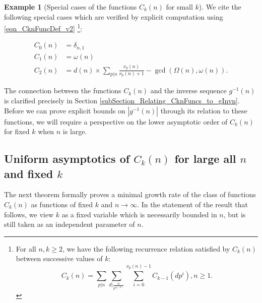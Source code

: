 \documentclass[11pt,reqno,a4letter]{article}
\numberwithin{figure}{section}
\numberwithin{table}{section}
\newcommand{\seqnum}[1]{\href{http://oeis.org/#1}{\color{ProcessBlue}{\underline{#1}}}}
\theoremstyle{plain}
\numberwithin{theorem}{section}
\theoremstyle{definition}
\newtheorem{example}[theorem]{Example}
\newcommand{\NBRef}[1]{}
\begin{document}
\begin{example}[Special cases of the functions $C_k(n)$ for small $k$] 
\label{example_SpCase_Ckn} 
We cite the following special cases which are verified by 
explicit computation using \eqref{eqn_CknFuncDef_v2} 
\cite[\seqnum{A066922}]{OEIS}\footnote{ 
     For all $n,k \geq 2$, we have the following recurrence 
     relation satisfied by $C_k(n)$ between successive values of $k$: 
     \begin{equation*}
     C_k(n) = \sum_{p|n} \sum_{d\rvert\frac{n}{p^{\nu_p(n)}}} \sum_{i=0}^{\nu_p(n)-1} 
          C_{k-1}\left(dp^i\right), n \geq 1. 
     \end{equation*}
}: 
\NBRef{A07-2020-04-26} 
\begin{align*} 
C_0(n) & = \delta_{n,1} \\ 
C_1(n) & = \omega(n) \\ 
C_2(n) & = d(n) \times \sum_{p|n} \frac{\nu_p(n)}{\nu_p(n)+1} - \gcd\left(\Omega(n), \omega(n)\right). 
\end{align*} 
\end{example} 

The connection between the functions $C_k(n)$ and the inverse sequence $g^{-1}(n)$ is 
clarified precisely in Section \ref{subSection_Relating_CknFuncs_to_gInvn}. Before we can prove explicit 
bounds on $|g^{-1}(n)|$ through its relation to these functions, we will require a perspective 
on the lower asymptotic order of $C_k(n)$ for fixed $k$ when $n$ is large. 

\subsection{Uniform asymptotics of $C_k(n)$ for large all $n$ and fixed $k$} 

The next theorem formally proves a minimal growth rate of the class of functions 
$C_k(n)$ as functions of fixed $k$ and $n \rightarrow \infty$. 
In the statement of the result that follows, we view $k$ as a fixed variable which is 
necessarily bounded in $n$, but is still taken as an independent parameter of $n$. 
\end{document}
